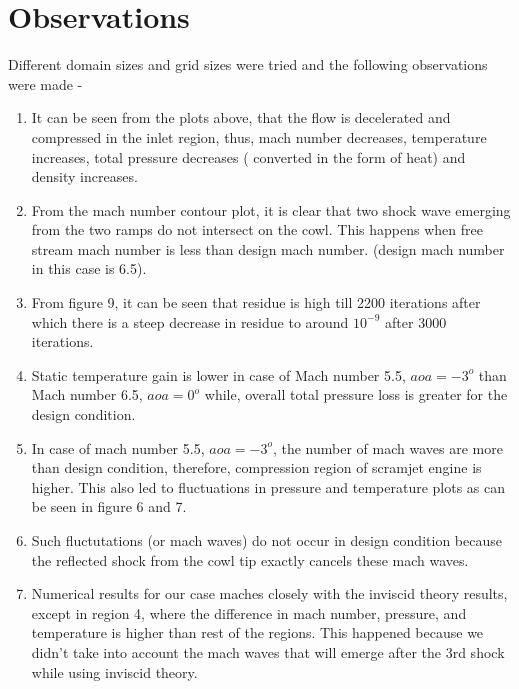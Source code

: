 \documentclass{article}
\begin{document}
\section*{Observations}
Different domain sizes and grid sizes were tried and the following observations were made -
\begin{enumerate}
\item It can be seen from the plots above, that the flow is decelerated and compressed in the inlet region, thus, mach number decreases, temperature increases, total pressure decreases ( converted in the form of heat) and density increases.
\item From the mach number contour plot, it is clear that two shock wave emerging from the two ramps do not intersect on the cowl. This happens when free stream mach number is less than design mach number. (design mach number in this case is 6.5).
\item From figure 9, it can be seen that residue is high till 2200 iterations after which there is a steep decrease in residue to around $10^{-9}$ after 3000 iterations.
\item Static temperature gain is lower in case of Mach number 5.5, $aoa = -3^o$ than Mach number 6.5, $aoa = 0^o$ while, overall total pressure loss is greater for the design condition.
\item In case of mach number 5.5, $aoa = -3^o$, the number of mach waves are more than design condition, therefore, compression region of scramjet engine is higher. This also led to fluctuations in pressure and temperature plots as can be seen in figure 6 and 7.
\item Such fluctutations (or mach waves) do not occur in design condition because the reflected shock from the cowl tip exactly cancels these mach waves.
\item Numerical results for our case maches closely with the inviscid theory results, except in region 4, where the difference in mach number, pressure, and temperature is higher than rest of the regions. This happened because we didn't take into account the mach waves that will emerge after the 3rd shock while using inviscid theory.
\end{enumerate}
\end{document}
